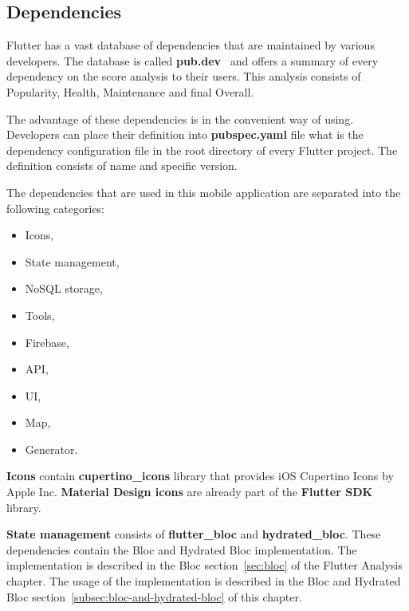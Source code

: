 \subsection{Dependencies}\label{subsec:dependencies}
Flutter has a vast database of dependencies that are maintained by various developers.
The database is called \textbf{pub.dev}~\cite{pubDev} and offers a summary of every dependency on the score analysis to their users.
This analysis consists of Popularity, Health, Maintenance and final Overall.

The advantage of these dependencies is in the convenient way of using.
Developers can place their definition into \textbf{pubspec.yaml} file what is the dependency configuration file in the root directory of every Flutter project.
The definition consists of name and specific version.

The dependencies that are used in this mobile application are separated into the following categories:
\begin{itemize}
    \item Icons,
    \item State management,
    \item NoSQL storage,
    \item Tools,
    \item Firebase,
    \item API,
    \item UI,
    \item Map,
    \item Generator.
\end{itemize}

\textbf{Icons} contain \textbf{cupertino\_icons} library that provides iOS Cupertino Icons by Apple Inc.
\textbf{Material Design icons} are already part of the \textbf{Flutter SDK} library.

\textbf{State management} consists of \textbf{flutter\_bloc} and \textbf{hydrated\_bloc}.
These dependencies contain the Bloc and Hydrated Bloc implementation.
The implementation is described in the Bloc section~\ref{sec:bloc} of the Flutter Analysis chapter.
The usage of the implementation is described in the Bloc and Hydrated Bloc section~\ref{subsec:bloc-and-hydrated-bloc} of this chapter.

